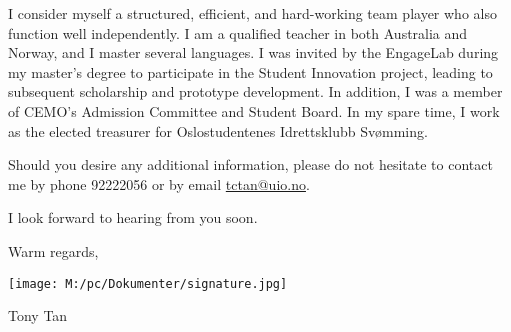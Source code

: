 \documentclass[
    a4paper,                %
    11pt,                   %
    stu,                    %
    donotrepeattitle,       %
    floatsintext,           %
    biblatex,               %
    colorlinks=true,        %
    linkcolor=red,          %
    anchorcolor=black,      %
    citecolor=blue,         %
    urlcolor=blue,          %
    bookmarks=true,         %
    bookmarksopen=false,    %
    bookmarksnumbered=true, %
    dvipsnames              %
]{apa7}
\begin{document}
I consider myself a structured, efficient, and hard-working team player who also function well independently. I am a qualified teacher in both Australia and Norway, and I master several languages. I was invited by the EngageLab during my master's degree to participate in the Student Innovation project, leading to subsequent scholarship and prototype development. In addition, I was a member of CEMO's Admission Committee and Student Board. In my spare time, I work as the elected treasurer for Oslostudentenes Idrettsklubb Svømming.

Should you desire any additional information, please do not hesitate to contact me by phone 92222056 or by email \href{tctan@uio.no}{tctan@uio.no}.

\bigskip

\noindent I look forward to hearing from you soon.

\bigskip

\noindent  Warm regards,

\noindent \texttt{[image: M:/pc/Dokumenter/signature.jpg]}

\noindent Tony Tan
\end{document}
